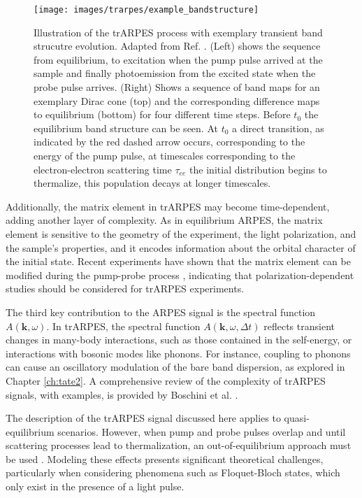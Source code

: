 \begin{figure}
	\centering
	\texttt{[image: images/trarpes/example\_bandstructure]}
	\caption{Illustration of the trARPES process with exemplary transient band strucutre evolution. Adapted from Ref. \cite{boschini_time-resolved_2024}. (Left) shows the sequence from equilibrium, to excitation when the pump pulse arrived at the sample and finally photoemission from the excited state when the probe pulse arrives. (Right) Shows a sequence of band maps for an exemplary Dirac cone (top) and the corresponding difference maps to equilibrium (bottom) for four different time steps. Before $t_0$ the equilibrium band structure can be seen. At $t_0$ a direct transition, as indicated by the red dashed arrow occurs, corresponding to the energy of the pump pulse, at timescales corresponding to the electron-electron scattering time $\tau_{ee}$ the initial distribution begins to thermalize, this population decays at longer timescales.}
	\label{fig:example_bandstructure}
\end{figure}

Additionally, the matrix element in trARPES may become time-dependent, adding another layer of complexity.
As in equilibrium ARPES, the matrix element is sensitive to the geometry of the experiment, the light polarization, and the sample's properties, and it encodes information about the orbital character of the initial state.
Recent experiments have shown that the matrix element can be modified during the pump-probe process \cite{boschini_role_2020,freericks_constant_2016}, indicating that polarization-dependent studies should be considered for trARPES experiments.

The third key contribution to the ARPES signal is the spectral function $A(\mathbf{k}, \omega)$.
In trARPES, the spectral function $A(\mathbf{k}, \omega, \Delta t)$ reflects transient changes in many-body interactions, such as those contained in the self-energy, or interactions with bosonic modes like phonons.
For instance, coupling to phonons can cause an oscillatory modulation of the bare band dispersion, as explored in Chapter \ref{ch:tate2}.
A comprehensive review of the complexity of trARPES signals, with examples, is provided by Boschini et al. \cite{boschini_time-resolved_2024}.

The description of the trARPES signal discussed here applies to quasi-equilibrium scenarios.
However, when pump and probe pulses overlap and until scattering processes lead to thermalization, an out-of-equilibrium approach must be used \cite{schuler_theory_2021, freericks_what_2021, neufeld_time-_2022}.
Modeling these effects presents significant theoretical challenges, particularly when considering phenomena such as Floquet-Bloch states, which only exist in the presence of a light pulse.

